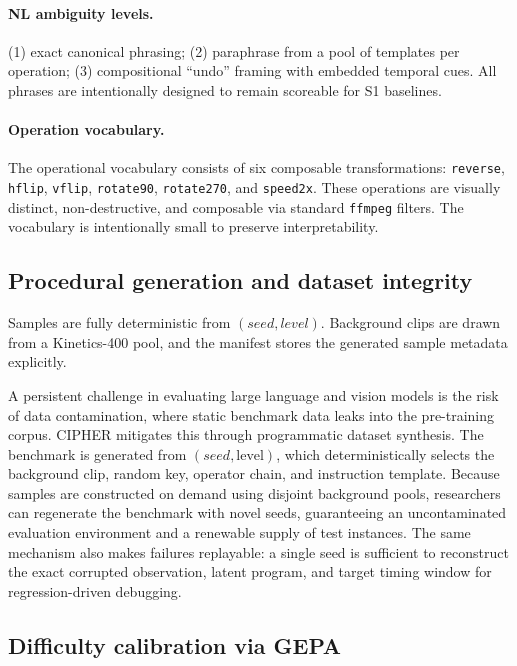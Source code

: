 \paragraph{NL ambiguity levels.}
(1) exact canonical phrasing; (2) paraphrase from a pool of templates per
operation; (3) compositional ``undo'' framing with embedded temporal cues. All
phrases are intentionally designed to remain scoreable for S1 baselines.

\paragraph{Operation vocabulary.}
The operational vocabulary consists of six composable transformations:
\texttt{reverse}, \texttt{hflip}, \texttt{vflip}, \texttt{rotate90},
\texttt{rotate270}, and \texttt{speed2x}. These operations are visually
distinct, non-destructive, and composable via standard \texttt{ffmpeg}
filters. The vocabulary is intentionally small to preserve interpretability.

\subsection{Procedural generation and dataset integrity}

Samples are fully deterministic from $(seed, level)$. Background clips are
drawn from a Kinetics-400 pool, and the manifest stores the generated sample
metadata explicitly.

A persistent challenge in evaluating large language and vision models is the
risk of data contamination, where static benchmark data leaks into the
pre-training corpus. CIPHER mitigates this through programmatic dataset
synthesis. The benchmark is generated from $(seed, \text{level})$, which
deterministically selects the background clip, random key, operator chain, and
instruction template. Because samples are constructed on demand using disjoint
background pools, researchers can regenerate the benchmark with novel seeds,
guaranteeing an uncontaminated evaluation environment and a renewable supply of
test instances. The same mechanism also makes failures replayable: a single
seed is sufficient to reconstruct the exact corrupted observation, latent
program, and target timing window for regression-driven debugging.

\subsection{Difficulty calibration via GEPA}
\label{sec:gepa}

